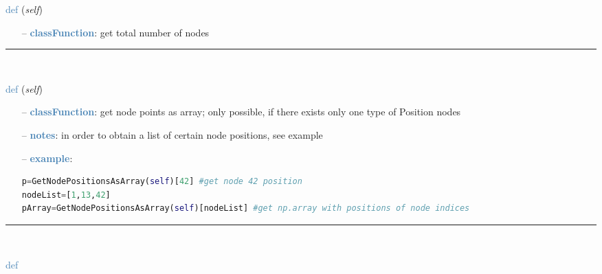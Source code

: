 \begin{itemize}[leftmargin=1.4cm]
\begin{itemize}[leftmargin=0.5cm]
\begin{itemize}[leftmargin=1.4cm]
\begin{itemize}[leftmargin=0.5cm]
\begin{flushleft}
\noindent \textcolor{steelblue}{def {\bf {}}}\label{sec:FEM:FEMinterface:NumberOfNodes}
({\it self})
\end{flushleft}
\setlength{\itemindent}{0.7cm}
\begin{itemize}[leftmargin=0.7cm]
  \item[--]  \textcolor{steelblue}{\bf classFunction}: get total number of nodes\vspace{12pt}\end{itemize}
%
\noindent\rule{8cm}{0.75pt}\vspace{1pt} \\ 
\begin{flushleft}
\noindent \textcolor{steelblue}{def {\bf {}}}\label{sec:FEM:FEMinterface:GetNodePositionsAsArray}
({\it self})
\end{flushleft}
\setlength{\itemindent}{0.7cm}
\begin{itemize}[leftmargin=0.7cm]
  \item[--]  \textcolor{steelblue}{\bf classFunction}: get node points as array; only possible, if there exists only one type of Position nodes  \item[--]  \textcolor{steelblue}{\bf notes}: in order to obtain a list of certain node positions, see example  \item[--]  \textcolor{steelblue}{\bf example}: \vspace{-12pt}\ei\begin{lstlisting}[language=Python, xleftmargin=36pt]
p=GetNodePositionsAsArray(self)[42] #get node 42 position
nodeList=[1,13,42]
pArray=GetNodePositionsAsArray(self)[nodeList] #get np.array with positions of node indices\end{lstlisting}\vspace{-24pt}\bi\item[]\vspace{-24pt}\vspace{12pt}\end{itemize}
%
\noindent\rule{8cm}{0.75pt}\vspace{1pt} \\ 
\begin{flushleft}
\noindent \textcolor{steelblue}{def {\bf {}}}\label{sec:FEM:FEMinterface:GetNodePositionsMean}

\end{flushleft}
\end{itemize}
\end{itemize}
\end{itemize}
\end{itemize}
